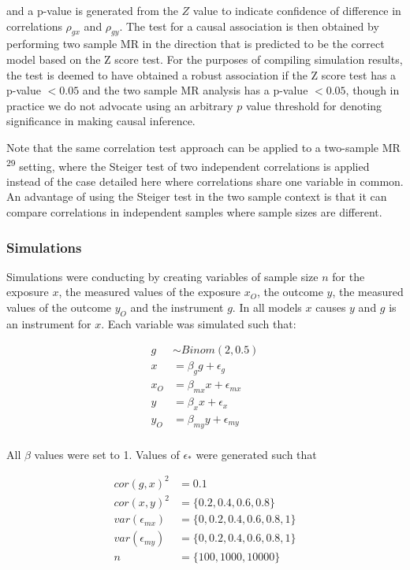 \documentclass[]{article}
\begin{document}
and a p-value is generated from the $Z$ value to indicate confidence of
difference in correlations $\rho_{gx}$ and $\rho_{gy}$. The test for a
causal association is then obtained by performing two sample MR in the
direction that is predicted to be the correct model based on the Z score
test. For the purposes of compiling simulation results, the test is
deemed to have obtained a robust association if the Z score test has a
p-value $< 0.05$ and the two sample MR analysis has a p-value $< 0.05$,
though in practice we do not advocate using an arbitrary $p$ value
threshold for denoting significance in making causal inference.

Note that the same correlation test approach can be applied to a
two-sample MR \textsuperscript{29} setting, where the Steiger test of
two independent correlations is applied instead of the case detailed
here where correlations share one variable in common. An advantage of
using the Steiger test in the two sample context is that it can compare
correlations in independent samples where sample sizes are different.

\subsubsection{Simulations}\label{simulations}

Simulations were conducting by creating variables of sample size $n$ for
the exposure $x$, the measured values of the exposure $x_O$, the outcome
$y$, the measured values of the outcome $y_O$ and the instrument $g$. In
all models $x$ causes $y$ and $g$ is an instrument for $x$. Each
variable was simulated such that:

\[
\begin{aligned}
g & \sim Binom(2, 0.5) \\
x & = \beta_g g + \epsilon_g \\
x_O & = \beta_{mx} x + \epsilon_{mx} \\
y & = \beta_x x + \epsilon_x \\
y_O & = \beta_{my} y + \epsilon_{my} \\
\end{aligned}
\]

All $\beta$ values were set to 1. Values of $\epsilon_*$ were generated
such that

\[
\begin{aligned}
cor(g, x)^2 & = 0.1 \\
cor(x, y)^2 & = \{0.2, 0.4, 0.6, 0.8\} \\
var(\epsilon_{mx}) & = \{0, 0.2, 0.4, 0.6, 0.8, 1\} \\
var(\epsilon_{my}) & = \{0, 0.2, 0.4, 0.6, 0.8, 1\} \\
n & = \{100, 1000, 10000\}
\end{aligned}
\]
\end{document}

